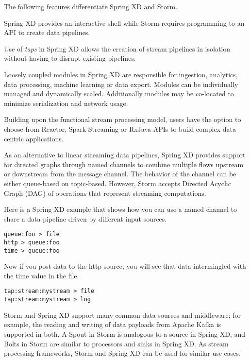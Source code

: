 The following features differentiate Spring XD and Storm.

\begin{itemize*}
\item Spring XD provides an interactive shell while Storm requires programming
to an API to create data pipelines.
\item Use of \emph{taps} in Spring XD allows the creation of stream pipelines
in isolation without having to disrupt existing pipelines.
\item Loosely coupled modules in Spring XD are responsible for ingestion, analytics,
data processing, machine learning or data export. Modules can be individually managed
and dynamically scaled. Additionally modules may be co-located to minimize
serialization and network usage.
\item Building upon the functional stream processing model, users have the option
to choose from Reactor\cite{reactor}, Spark Streaming or RxJava APIs to build
complex data centric applications.
\item As an alternative to linear streaming data pipelines, Spring XD provides
support for directed graphs through named channels to combine multiple flows
upstream or downstream from the message channel. The behavior of the channel
can be either queue-based on topic-based. However, Storm accepts Directed
Acyclic Graph (DAG)\cite{dag} of operations that represent streaming
computations.
\end{itemize*}

Here is a Spring XD example that shows how you can use a named channel to share
a data pipeline driven by different input sources.

\begin{lstlisting}
queue:foo > file
http > queue:foo
time > queue:foo
\end{lstlisting}

Now if you post data to the http source, you will see that data intermingled
with the time value in the file.

\begin{lstlisting}
tap:stream:mystream > file
tap:stream:mystream > log
\end{lstlisting}

Storm and Spring XD support many common data sources and middleware;
for example, the reading and writing of data payloads from Apache Kafka
is supported in both. A Spout in Storm is analogous to a
source in Spring XD, and Bolts in Storm are similar to processors and sinks
in Spring XD. As stream processing frameworks, Storm and Spring XD can be used for
similar use-cases.

